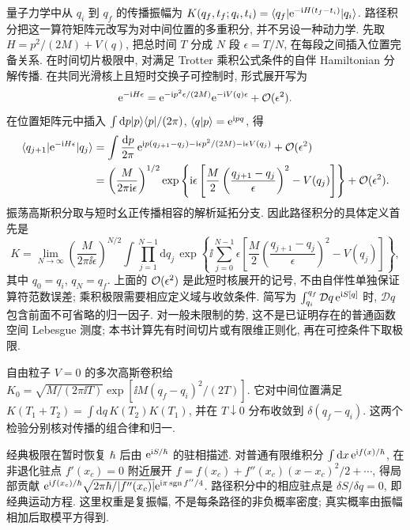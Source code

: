 \label{ch:path-integral}
量子力学中从 $q_i$ 到 $q_f$ 的传播振幅为 $K(q_f,t_f;q_i,t_i)=\langle q_f\rvert\mathrm e^{-\mathrm i H(t_f-t_i)}\lvert q_i\rangle$. 路径积分把这一算符矩阵元改写为对中间位置的多重积分, 并不另设一种动力学. 先取 $H=p^2/(2M)+V(q)$, 把总时间 $T$ 分成 $N$ 段 $\epsilon=T/N$, 在每段之间插入位置完备关系. 在时间切片极限中, 对满足 Trotter 乘积公式条件的自伴 Hamiltonian 分解传播. 在共同光滑核上且短时交换子可控制时, 形式展开写为
\[
\mathrm e^{-\mathrm i H\epsilon}=\mathrm e^{-\mathrm i p^2\epsilon/(2M)}\mathrm e^{-\mathrm i V(q)\epsilon}+\mathcal O(\epsilon^2).
\]
在位置矩阵元中插入 $\int\mathrm dp\lvert p\rangle\langle p\rvert/(2\pi)$, $\langle q\vert p\rangle=\mathrm e^{\mathrm i pq}$, 得
\begin{align*}
\langle q_{j+1}\rvert\mathrm e^{-\mathrm i H\epsilon}\lvert q_j\rangle
&=\int\frac{\mathrm dp}{2\pi}\,
\mathrm e^{\mathrm i p(q_{j+1}-q_j)-\mathrm i\epsilon p^2/(2M)-\mathrm i\epsilon V(q_j)}+\mathcal O(\epsilon^2)\\
&=\left(\frac M{2\pi\mathrm i\epsilon}\right)^{1/2}
\exp\left\{\mathrm i\epsilon\left[\frac M2\left(\frac{q_{j+1}-q_j}{\epsilon}\right)^2-V(q_j)\right]\right\}
+\mathcal O(\epsilon^2).
\end{align*}
振荡高斯积分取与短时幺正传播相容的解析延拓分支. 因此路径积分的具体定义首先是
\[
K=\lim_{N\to\infty}\left(\frac M{2\pi\ii\epsilon}\right)^{N/2}
\int\prod_{j=1}^{N-1}\mathrm dq_j\,
\exp\left\{\ii\sum_{j=0}^{N-1}\epsilon\left[\frac M2\left(\frac{q_{j+1}-q_j}{\epsilon}\right)^2-V(q_j)\right]\right\},
\]
其中 $q_0=q_i$, $q_N=q_f$. 上面的 $\mathcal O(\epsilon^2)$ 是此短时核展开的记号, 不由自伴性单独保证算符范数误差; 乘积极限需要相应定义域与收敛条件. 简写为 $\int_{q_i}^{q_f}\mathcal Dq\,\mathrm e^{\mathrm i S[q]}$ 时, $\mathcal Dq$ 包含前面不可省略的归一因子. 对一般未限制的势, 这不是已证明存在的普通函数空间 Lebesgue 测度; 本书计算先有时间切片或有限维正则化, 再在可控条件下取极限.

自由粒子 $V=0$ 的多次高斯卷积给 $K_0=\sqrt{M/(2\pi\ii T)}\exp[\ii M(q_f-q_i)^2/(2T)]$. 它对中间位置满足 $K(T_1+T_2)=\int\mathrm dq\,K(T_2)K(T_1)$, 并在 $T\downarrow0$ 分布收敛到 $\delta(q_f-q_i)$. 这两个检验分别核对传播的组合律和归一.

经典极限在暂时恢复 $\hbar$ 后由 $\mathrm e^{\mathrm i S/\hbar}$ 的驻相描述. 对普通有限维积分 $\int\mathrm dx\,\mathrm e^{\mathrm i f(x)/\hbar}$, 在非退化驻点 $f'(x_c)=0$ 附近展开 $f=f(x_c)+f''(x_c)(x-x_c)^2/2+\cdots$, 得局部贡献 $\mathrm e^{\mathrm i f(x_c)/\hbar}\sqrt{2\pi\hbar/|f''(x_c)|}\mathrm e^{\mathrm i\pi\operatorname{sgn}f''/4}$. 路径积分中的相应驻点是 $\delta S/\delta q=0$, 即经典运动方程. 这里权重是复振幅, 不是每条路径的非负概率密度; 真实概率由振幅相加后取模平方得到.

